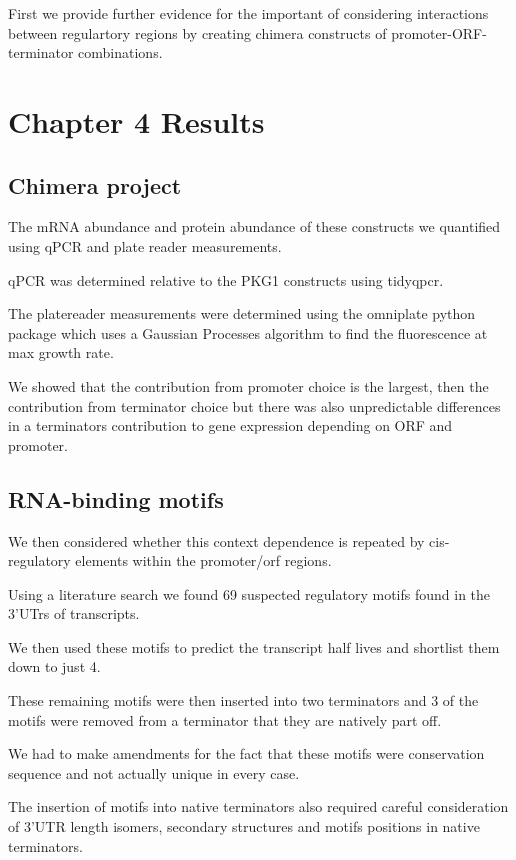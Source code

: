 \documentclass{SBCbookchapter}
\begin{document}
 First we provide further evidence for the important of considering interactions between regulartory regions by creating chimera constructs of promoter-ORF-terminator combinations.
 
\section{Chapter 4 Results}

\subsection{Chimera project}

The mRNA abundance and protein abundance of these constructs we quantified using qPCR and plate reader measurements.

qPCR was determined relative to the PKG1 constructs using tidyqpcr.

The platereader measurements were determined using the omniplate python package which uses a Gaussian Processes algorithm to find the fluorescence at max growth rate.

We showed that the contribution from promoter choice is the largest, then the contribution from terminator choice but there was also unpredictable differences in a terminators contribution to gene expression depending on ORF and promoter.

\subsection{RNA-binding motifs}

We then considered whether this context dependence is repeated by cis-regulatory elements within the promoter/orf regions.

Using a literature search we found 69 suspected regulatory motifs found in the 3'UTrs of transcripts.

We then used these motifs to predict the transcript half lives and shortlist them down to just 4.

These remaining motifs were then inserted into two terminators and 3 of the motifs were removed from a terminator that they are natively part off.

We had to make amendments for the fact that these motifs were conservation sequence and not actually unique in every case.

The insertion of motifs into native terminators also required careful consideration of 3'UTR length isomers, secondary structures and motifs positions in native terminators.
\end{document}
